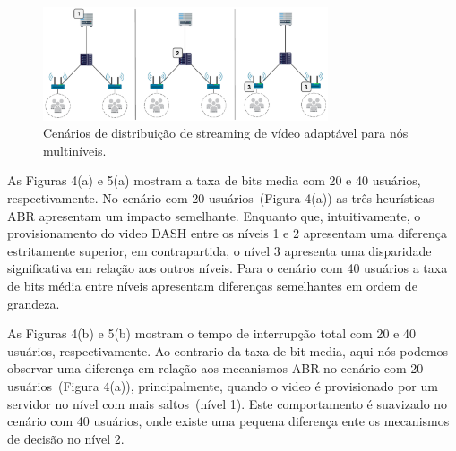 

\vspace{0.8cm}
\begin{figure}[htpb]
	\centering
	\includegraphics[width=0.75\textwidth]{img/exp-multi-lvl}
	\caption{Cenários de distribuição de streaming de vídeo adaptável para nós multiníveis.}
	\label{fig:scenario-arch}
\end{figure}

As Figuras 4(a) e 5(a) mostram a taxa de bits media com 20 e 40 usuários, respectivamente. No cenário com 20 usuários~(Figura 4(a)) as três heurísticas ABR apresentam um impacto semelhante. Enquanto que, intuitivamente, o provisionamento do video DASH entre os níveis 1 e 2 apresentam uma diferença estritamente superior, em contrapartida, o nível 3 apresenta uma disparidade significativa em relação aos outros níveis. Para o cenário com 40 usuários a taxa de bits média entre níveis apresentam diferenças semelhantes em ordem de grandeza. 

As Figuras 4(b) e 5(b) mostram o tempo de interrupção total com 20 e 40 usuários, respectivamente. Ao contrario da taxa de bit media, aqui nós podemos observar uma diferença em relação aos mecanismos ABR no cenário com 20 usuários~(Figura 4(a)), principalmente, quando o video é provisionado por um servidor no nível com mais saltos~(nível 1). Este comportamento é suavizado no cenário com 40 usuários, onde existe uma pequena diferença ente os mecanismos de decisão no nível 2.

